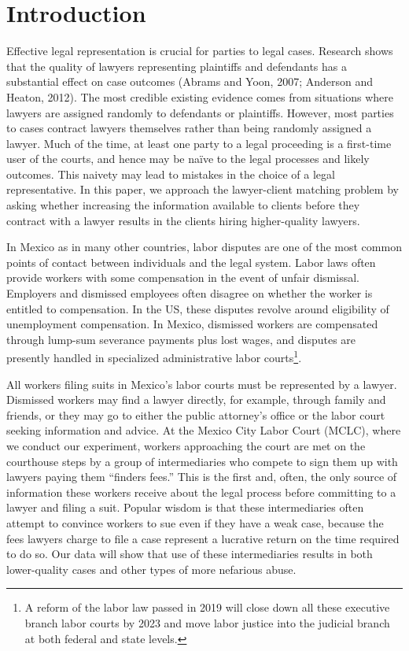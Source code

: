 \documentclass[oneside,12pt]{article}
\begin{document}
\pagebreak \newpage




\doublespacing


\section{Introduction} \label{sec:introduction}
Effective legal representation is crucial for parties to legal cases. Research shows that the quality of lawyers representing plaintiffs and defendants has a substantial effect on case outcomes (Abrams and Yoon, 2007; Anderson and Heaton, 2012). The most credible existing evidence comes from situations where lawyers are assigned randomly to defendants or plaintiffs. However, most parties to cases contract lawyers themselves rather than being randomly assigned a lawyer. Much of the time, at least one party to a legal proceeding is a first-time user of the courts, and hence may be naïve to the legal processes and likely outcomes. This naivety may lead to mistakes in the choice of a legal representative. In this paper, we approach the lawyer-client matching problem by asking whether increasing the information available to clients before they contract with a lawyer results in the clients hiring higher-quality lawyers. 

In Mexico as in many other countries, labor disputes are one of the most common points of contact between individuals and the legal system. Labor laws often provide workers with some compensation in the event of unfair dismissal. Employers and dismissed employees often disagree on whether the worker is entitled to compensation. In the US, these disputes revolve around eligibility of unemployment compensation. In Mexico, dismissed workers are compensated through lump-sum severance payments plus lost wages, and disputes are presently handled in specialized administrative labor courts\footnote{A reform of the labor law passed in 2019 will close down all these executive branch labor courts by 2023 and move labor justice into the judicial branch at both federal and state levels.}. 

All workers filing suits in Mexico’s labor courts must be represented by a lawyer. Dismissed workers may find a lawyer directly, for example, through family and friends, or they may go to either the public attorney’s office or the labor court seeking information and advice. At the Mexico City Labor Court (MCLC), where we conduct our experiment, workers approaching the court are met on the courthouse steps by a group of intermediaries who compete to sign them up with lawyers paying them “finders fees.” This is the first and, often, the only source of information these workers receive about the legal process before committing to a lawyer and filing a suit. Popular wisdom is that these intermediaries often attempt to convince workers to sue even if they have a weak case, because the fees lawyers charge to file a case represent a lucrative return on the time required to do so. Our data will show that use of these intermediaries results in both lower-quality cases and other types of more nefarious abuse. 
\end{document}
